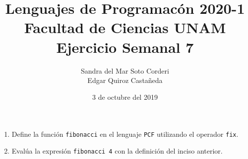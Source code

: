 \documentclass{article}
\title{
    Lenguajes de Programacón 2020-1\\
    Facultad de Ciencias UNAM\\
    Ejercicio Semanal 7
}
\author{
    Sandra del Mar Soto Corderi\\
    Edgar Quiroz Castañeda
}
\date{
    3 de octubre del 2019
}
\begin{document}
    \maketitle

    \begin{enumerate}
        \item {
            Define la función \texttt{fibonacci} en el lenguaje \texttt{PCF}
            utilizando el operador \texttt{fix}.
        }
        \item {
            Evalúa la expresión \texttt{fibonacci 4} con la definición del
            inciso anterior.
        }
    \end{enumerate}
\end{document}
